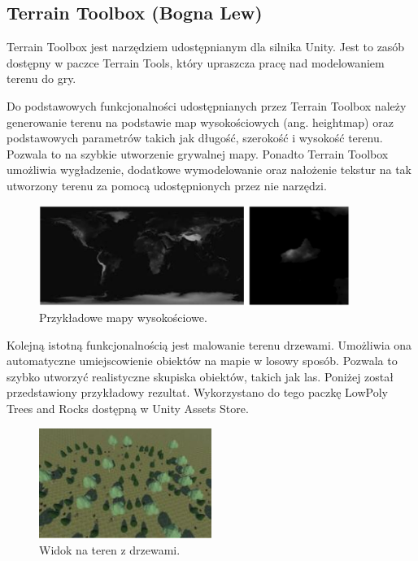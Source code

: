 \subsection{Terrain Toolbox (Bogna Lew)}
Terrain Toolbox jest narzędziem udostępnianym dla silnika Unity. Jest to zasób dostępny w paczce Terrain Tools, który
upraszcza pracę nad modelowaniem terenu do gry.

Do podstawowych funkcjonalności udostępnianych przez Terrain Toolbox należy generowanie terenu na podstawie
map wysokościowych (ang. heightmap) oraz podstawowych parametrów takich jak długość, szerokość i wysokość terenu.
Pozwala to na szybkie utworzenie grywalnej mapy. Ponadto Terrain Toolbox umożliwia wygładzenie, dodatkowe
wymodelowanie oraz nałożenie tekstur na tak utworzony terenu za pomocą udostępnionych przez nie narzędzi.

\begin{figure}[h!]
    \centering
    \includegraphics[width=0.9\textwidth]{images/modelowanie_terenu/przykladowe_heightmapy.jpg}
    \caption{Przykładowe mapy wysokościowe.}
\end{figure}

Kolejną istotną funkcjonalnością jest malowanie terenu drzewami. Umożliwia ona automatyczne umiejscowienie obiektów na
mapie w losowy sposób. Pozwala to szybko utworzyć realistyczne skupiska obiektów, takich jak las. Poniżej
został przedstawiony przykładowy rezultat. Wykorzystano do tego paczkę LowPoly Trees and Rocks dostępną w Unity
Assets Store.

\begin{figure}[h!]
    \centering
    \includegraphics[width=0.5\textwidth]{images/modelowanie_terenu/drzewa.jpg}
    \caption{Widok na teren z drzewami.}
\end{figure}
